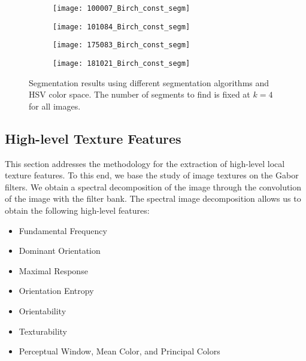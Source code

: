 \begin{figure}[!ht]
    \begin{subfigure}[t]{\textwidth+20pt\relax}
    	\centering
    	\texttt{[image: 100007\_Birch\_const\_segm]} 
    \end{subfigure}      
    \begin{subfigure}[b]{0.23\textwidth}
    	\centering
        \texttt{[image: 101084\_Birch\_const\_segm]}
    \end{subfigure}
    \begin{subfigure}[b]{0.23\textwidth}
    	\centering
        \texttt{[image: 175083\_Birch\_const\_segm]}
    \end{subfigure}
    \begin{subfigure}[b]{0.23\textwidth}
    	\centering
        \texttt{[image: 181021\_Birch\_const\_segm]}
    \end{subfigure}     
	\caption{Segmentation results using different segmentation algorithms and HSV color space. The number of segments to find is fixed at $ k = 4 $ for all images. }\label{fig:BSD_clustering_results}    
\end{figure}


\subsection{High-level Texture Features}\label{sec:high_level_features}
This section addresses the methodology for the extraction of high-level local texture features. To this end, we base the study of image textures on the Gabor filters. We obtain a spectral decomposition of the image through the convolution of the image with the filter bank. The spectral image decomposition allows us to obtain the following high-level features:

\begin{itemize}
	\item Fundamental Frequency
	\item Dominant Orientation
	\item Maximal Response
	\item Orientation Entropy
	\item Orientability
	\item Texturability 
	\item Perceptual Window, Mean Color, and Principal Colors
\end{itemize}

